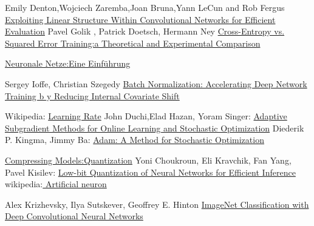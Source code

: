 \documentclass[12pt,a4paper]{scrartcl}
\numberwithin{equation}{section}
\begin{document}
\begin{thebibliography}{lem00}
   		Emily Denton,Wojciech Zaremba,Joan Bruna,Yann LeCun and	Rob Fergus
   		\href{https://arxiv.org/pdf/1404.0736.pdf}{Exploiting Linear Structure Within Convolutional
   			Networks for Efficient Evaluation}
 	 Pavel Golik , Patrick Doetsch, Hermann Ney
 	\href{http://books.jackon.me/Cross-Entropy-vs-Squared-Error-Training-a-Theoretical-and-Experimental-Comparison.pdf}{Cross-Entropy vs. Squared Error Training:a Theoretical and Experimental Comparison}
 	
 	\href{http://www.neuronalesnetz.de/aktivitaet.html}{Neuronale Netze:Eine Einführung}
 	
	Sergey Ioffe, Christian Szegedy
 	\href{https://arxiv.org/pdf/1502.03167.pdf}{Batch Normalization: Accelerating Deep Network Training b
 		y
 		Reducing Internal Covariate Shift}

	Wikipedia:
		\href{https://en.wikipedia.org/wiki/Learning_rate}{Learning Rate}
		John Duchi,Elad Hazan, Yoram Singer:
		\href{http://www.jmlr.org/papers/volume12/duchi11a/duchi11a.pdf}{Adaptive Subgradient Methods for
			Online Learning and Stochastic Optimization}
		Diederik P. Kingma, Jimmy Ba:
		\href{https://arxiv.org/abs/1412.6980}{Adam: A Method for Stochastic Optimization}
		
		\href{https://nervanasystems.github.io/distiller/quantization.html}{Compressing Models:Quantization}
		Yoni Choukroun, Eli Kravchik, Fan Yang, Pavel Kisilev:
			\href{https://arxiv.org/abs/1902.06822}{Low-bit Quantization of Neural Networks for Efficient Inference}
	wikipedia:\href{https://en.wikipedia.org/wiki/Artificial_neuron}{ Artificial neuron}
	
	Alex Krizhevsky, Ilya Sutskever, Geoffrey E. Hinton
		\href{https://papers.nips.cc/paper/4824-imagenet-classification-with-deep-convolutional-neural-networks.pdf}{ImageNet Classification with Deep Convolutional Neural Networks}
  

\end{thebibliography}
\end{document}
